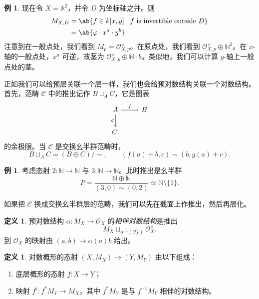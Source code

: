 \documentclass{amsart}
\theoremstyle{definition}
\newtheorem{defn}[thm]{定义}
\newtheorem{exm}[thm]{例}
\theoremstyle{remark}
\theoremstyle{plain}
\theoremstyle{definition}
\theoremstyle{remark}
\newcommand{\A}{\mathbb{A}}
\newcommand{\N}{\mathbb{N}}
\newcommand{\mc}[1]{\mathcal{#1}}
\newcommand{\ul}[1]{\underline{#1}}
\newcommand{\1}{\mathbf{1}}
\newcommand{\2}{\mathbf{2}}
\newcommand{\3}{\mathbf{3}}
\begin{document}
\begin{exm}
    现在令 \(X = \A^2\)，并令 \(D\) 为坐标轴之并。则
    \begin{align*}
        M_{X,D} &= \ab\{f \in k[x,y] \mid f \text{ is invertible outside } D \} \\
        &= \ab\{\varphi \cdot x^a \cdot y^b\}.
    \end{align*}
    注意到在一般点处，我们看到 \(M_p = \mc{O}_{X,p}^{\times}\)。在原点处，我们看到 \(\mc{O}_{X,p}^{\times}\oplus \N^2\)。在 \(x\)-轴的一般点处，\(x^a\) 可逆，故茎为 \(\mc{O}_{X,p}^{\times}\oplus \N \cdot b\)。类似地，我们可以计算 \(y\)-轴上一般点处的茎。
\end{exm}

正如我们可以给预层关联一个层一样，我们也会给预对数结构关联一个对数结构。首先，范畴 \(\mc{C}\) 中的推出记作 \(B \sqcup_A C\)，它是图表
\begin{equation*}
\begin{tikzcd}
    A \ar{r}{f} \ar{d}[swap]{g} & B \\
    C.
\end{tikzcd}
\end{equation*}
的余极限。当 \(\mc{C}\) 是交换幺半群范畴时，
\[ B \sqcup_A C = (B \oplus C)/\sim, \qquad (f(a) + b, c) \sim (b, g(a)+c). \]

\begin{exm}
    考虑态射 \(2 \colon \N \to \N\) 与 \(3 \colon \N \to \N\)。此时推出是幺半群
    \[ P = \frac{\N \oplus \N}{(3, 0) \sim (0,2)} \simeq \N \setminus \{1\}. \]
\end{exm}

如果把 \(\mc{C}\) 换成交换幺半群层的范畴，我们可以先在截面上作推出，然后再层化。

\begin{defn}
    预对数结构 \(\alpha \colon M_X \to \mc{O}_X\) 的\textit{相伴对数结构}是推出
    \[ M_X \sqcup_{\alpha^{-1}(\mc{O}_X^{\times})} \mc{O}_X^{\times}. \]
    到 \(\mc{O}_X\) 的映射由 \((a,b) \to \alpha(a) b\) 给出。
\end{defn}

\begin{defn}
    对数概形的态射 \((X, M_X) \to (Y, M_Y)\) 由以下组成：
    \begin{enumerate}
        \item 底层概形的态射 \(\ul{f} \colon \ul{X} \to \ul{Y}\)；
        \item 映射 \(f^{\flat} \colon f^* M_Y \to M_X\)，其中 \(f^* M_Y\) 是与 \(f^{-1} M_Y\) 相伴的对数结构。
    \end{enumerate}
\end{defn}
\end{document}
